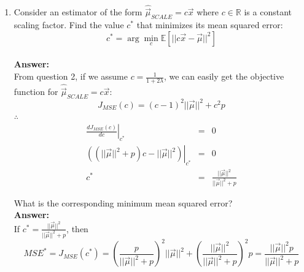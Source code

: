 \documentclass{article}
\begin{document}
\begin{enumerate}
	\item Consider an estimator of the form $\hat{\vec{\mu}}_{SCALE} = c\vec{x}$ where $c\in \mathbb{R}$ is a constant scaling factor. Find the value $c^*$ that minimizes its mean squared error:
	$$c^* = \arg\min_c{\mathbb{E}[||c\vec{x}-\vec{\mu}||^2]}$$
	\\\textbf{Answer:}\\
	From question 2, if we assume $c=\frac{1}{1+2\lambda}$, we can easily get the objective function for $\hat{\vec{\mu}}_{SCALE} = c\vec{x}$:
	$$J_{MSE}(c)=(c-1)^2||\vec{\mu}||^2+c^2p$$
	$\therefore$
	\begin{equation}
	\nonumber
	\begin{array}{rcl}
	\left.\frac{dJ_{MSE}(c)}{dc}\right|_{c^*} & = & 0 \\
	\left.((||\vec{\mu}||^2+p)c-||\vec{\mu}||^2)\right|_{c^*} & = & 0 \\
	c^* & = & \frac{||\vec{\mu}||^2}{||\vec{\mu}||^2+p}
	\end{array}
	\end{equation}
	
	What is the corresponding minimum mean squared error?
	\\\textbf{Answer:}\\
	If $c^* = \frac{||\vec{\mu}||^2}{||\vec{\mu}||^2+p}$, then 
	$$MSE^*=J_{MSE}(c^*)=(\frac{p}{||\vec{\mu}||^2+p})^2||\vec{\mu}||^2+(\frac{||\vec{\mu}||^2}{||\vec{\mu}||^2+p})^2p=\frac{||\vec{\mu}||^2p}{||\vec{\mu}||^2+p}$$
	

\end{enumerate}
\end{document}
